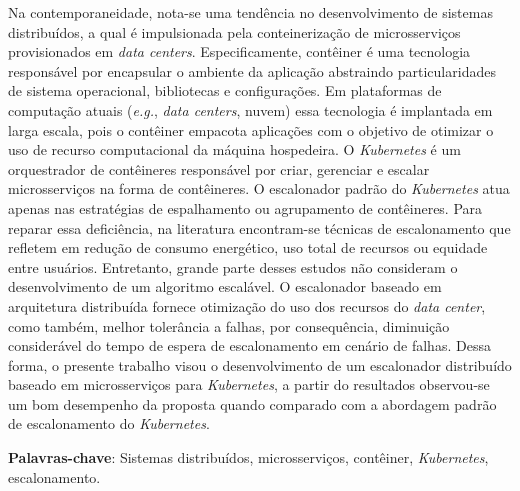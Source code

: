 \setlength{\absparsep}{18pt} %
\begin{resumo}
    Na contemporaneidade, nota-se uma tendência no desenvolvimento de sistemas distribuídos, a qual é impulsionada pela conteinerização de microsserviços provisionados em \textit{data centers}. Especificamente, contêiner é uma tecnologia responsável por encapsular o ambiente da aplicação abstraindo particularidades de sistema operacional, bibliotecas e configurações. Em plataformas de computação atuais (\textit{e.g.}, \textit{data centers}, nuvem) essa tecnologia é implantada em larga escala, pois o contêiner empacota aplicações com o objetivo de otimizar o uso de recurso computacional da máquina hospedeira. O \textit{Kubernetes} é um orquestrador de contêineres responsável por criar, gerenciar e escalar microsserviços na forma de contêineres. O escalonador padrão do \textit{Kubernetes} atua apenas nas estratégias de espalhamento ou agrupamento de contêineres. Para reparar essa deficiência, na literatura encontram-se técnicas de escalonamento que refletem em redução de consumo energético, uso total de recursos ou equidade entre usuários. Entretanto, grande parte desses estudos não consideram o desenvolvimento de um algoritmo escalável. O escalonador baseado em arquitetura distribuída fornece otimização do uso dos recursos do \textit{data center}, como também, melhor tolerância a falhas, por consequência, diminuição considerável do tempo de espera de escalonamento em cenário de falhas. Dessa forma, o presente trabalho visou o desenvolvimento de um escalonador distribuído baseado em microsserviços para \textit{Kubernetes}, a partir do resultados observou-se um bom desempenho da proposta quando comparado com a abordagem padrão de escalonamento do \textit{Kubernetes}.
    
    \textbf{Palavras-chave}: Sistemas distribuídos, microsserviços, contêiner, \textit{Kubernetes}, escalonamento.
\end{resumo}

